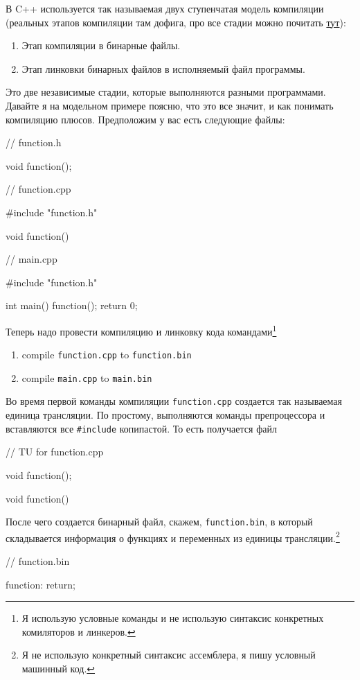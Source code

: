 \documentclass{article}
\begin{document}
В C++ используется так называемая двух ступенчатая модель компиляции (реальных этапов компиляции там дофига, про все стадии можно почитать \href{https://en.cppreference.com/w/cpp/language/translation_phases}{тут}):
\begin{enumerate}
\item Этап компиляции в бинарные файлы.
\item Этап линковки бинарных файлов в исполняемый файл программы.
\end{enumerate}
Это две независимые стадии, которые выполняются разными программами. Давайте я на модельном примере поясню, что это все значит, и как понимать компиляцию плюсов. Предположим у вас есть следующие файлы:
\begin{cppcode}
// function.h

void function();

// function.cpp

#include "function.h"

void function() {
}

// main.cpp

#include "function.h"

int main() {
  function();
  return 0;
}
\end{cppcode}
Теперь надо провести компиляцию и линковку кода командами\footnote{Я использую условные команды и не использую синтаксис конкретных комиляторов и линкеров.}
\begin{enumerate}
\item compile \verb"function.cpp" to \verb"function.bin"
\item compile \verb"main.cpp" to \verb"main.bin"
\end{enumerate}
Во время первой команды компиляции \verb"function.cpp" создается так называемая единица трансляции. По простому, выполняются команды препроцессора и вставляются все \verb"#include" копипастой. То есть получается файл
\begin{cppcode}
// TU for function.cpp

void function();

void function() {
}
\end{cppcode}
После чего создается бинарный файл, скажем, \verb"function.bin", в который складывается информация о функциях и переменных из единицы трансляции.\footnote{Я не использую конкретный синтаксис ассемблера, я пишу условный машинный код.}
\begin{cppcode}
// function.bin

function:
  return;
\end{cppcode}
\end{document}
